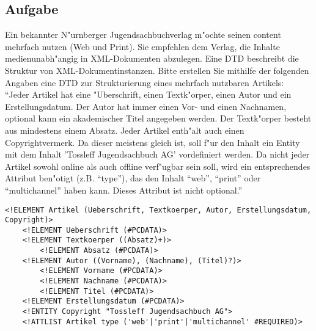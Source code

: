 \subsection{Aufgabe}
Ein bekannter N"urnberger Jugendsachbuchverlag m"ochte seinen content mehrfach nutzen (Web und Print). 
Sie empfehlen dem Verlag, die Inhalte medienunabh"angig in XML-Dokumenten abzulegen.
Eine DTD beschreibt die Struktur von XML-Dokumentinstanzen.
Bitte erstellen Sie mithilfe der folgenden Angaben eine DTD zur Strukturierung eines mehrfach nutzbaren Artikels:\\

"`Jeder Artikel hat eine "Uberschrift, einen Textk"orper, einen Autor und ein Erstellungsdatum.
Der Autor hat immer einen Vor- und einen Nachnamen, optional kann ein akademischer Titel angegeben werden.
Der Textk"orper besteht aus mindestens einem Absatz.
Jeder Artikel enth"alt auch einen Copyrightvermerk.
Da dieser meistens gleich ist, soll f"ur den Inhalt ein Entity mit dem Inhalt 'Tossleff Jugendsachbuch AG' vordefiniert werden.
Da nicht jeder Artikel sowohl online als auch offline verf"ugbar sein soll, wird ein entsprechendes Attribut ben"otigt (z.B. "`type"'), das den Inhalt "`web"', "`print"' oder "`multichannel"' haben kann.
Dieses Attribut ist nicht optional."'\\

\lstset{style=customXML}
\begin{lstlisting}
<!ELEMENT Artikel (Ueberschrift, Textkoerper, Autor, Erstellungsdatum, Copyright)>
    <!ELEMENT Ueberschrift (#PCDATA)>
    <!ELEMENT Textkoerper ((Absatz)+)>
        <!ELEMENT Absatz (#PCDATA)>
    <!ELEMENT Autor ((Vorname), (Nachname), (Titel)?)>
        <!ELEMENT Vorname (#PCDATA)>
        <!ELEMENT Nachname (#PCDATA)>
        <!ELEMENT Titel (#PCDATA)>
    <!ELEMENT Erstellungsdatum (#PCDATA)>
    <!ENTITY Copyright "Tossleff Jugendsachbuch AG">
    <!ATTLIST Artikel type ('web'|'print'|'multichannel' #REQUIRED)>
\end{lstlisting}
































































